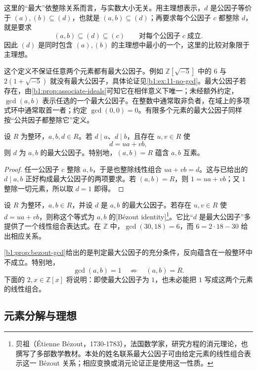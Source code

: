 这里的“最大”依整除关系而言，与实数大小无关。用主理想表示，\(d\) 是公因子等价于 \((a),(b)\subseteq(d)\)，也就是 \((a,b)\subseteq(d)\)；再要求每个公因子 \(c\) 都整除 \(d\)，就是要求
\[
	(a,b)\subseteq(d)\subseteq(c) \qquad\text{对每个公因子}\;c\;\text{成立}.
\]
因此 \((d)\) 是同时包含 \((a),(b)\) 的主理想中最小的一个，这里的比较对象限于主理想。

\ProseParagraphBreak
这个定义不保证任意两个元素都有最大公因子。例如 \(\mathbb Z[\sqrt{-5}]\) 中的 \(6\) 与 \(2(1+\sqrt{-5})\) 就没有最大公因子，具体论证见\cref{b1:ex:11-no-gcd}。最大公因子若存在，由\cref{b1:prop:associate-ideals}可知它在相伴意义下唯一；未经额外约定，\(\gcd(a,b)\) 表示任选的一个最大公因子。在整数中通常取非负者，在域上的多项式环中通常取首一者；约定 \(\gcd(0,0)=0\)。有限多个元素的最大公因子同样按“公共因子都整除它”定义。

\begin{proposition}\label{b1:prop:bezout-gcd}
	设 \(R\) 为整环，\(a,b,d\in R\)。若 \(d\mid a\)、\(d\mid b\)，且存在 \(u,v\in R\) 使
	\begin{equation}\label{b1:eq:bezout-ring}
		d=ua+vb,
	\end{equation}
	则 \(d\) 为 \(a,b\) 的最大公因子。特别地，\((a,b)=R\) 蕴含 \(a,b\) 互素。
\end{proposition}
\begin{proof}
	任一公因子 \(c\) 整除 \(a,b\)，于是也整除线性组合 \(ua+vb=d\)。这与已给出的 \(d\mid a,b\) 正好构成最大公因子的两项要求。若 \((a,b)=R\)，则 \(1=ua+vb\)；又 \(1\) 整除一切元素，所以取 \(d=1\) 即得。
\end{proof}

设 \(R\) 为整环，\(a,b\in R\)，并设 \(d\) 是 \(a,b\) 的最大公因子。若存在 \(u,v\in R\) 使 \(d=ua+vb\)，则称这个等式为 \(a,b\) 的[Bézout identity]\footnote{贝祖（Étienne Bézout，1730-1783），法国数学家，研究方程的消元理论，也撰写了多部数学教材。本处的姓名联系最大公因子可由给定元素的线性组合表示这一 Bézout 关系；相应变换或消元论证正是使用这一性质。}。它比“\(d\) 是最大公因子”多提供了一个线性组合表达式。在 \(\mathbb Z\) 中，\(\gcd(30,18)=6\)，而 \(6=2\cdot18-30\) 给出相应关系。

\ProseParagraphBreak
\cref{b1:prop:bezout-gcd}给出的是判定最大公因子的充分条件，反向蕴含在一般整环中不成立。特别地，
\[
	\gcd(a,b)=1\quad\not\Longrightarrow\quad(a,b)=R.
\]
下面的 \(2,x\in\mathbb Z[x]\) 将说明：即使最大公因子为 \(1\)，也未必能把 \(1\) 写成这两个元素的线性组合。

\subsection{元素分解与理想}
\label{b1:subsec:1101:03}

